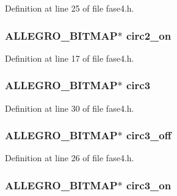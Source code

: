 Definition at line 25 of file fase4.\-h.

\hypertarget{struct_level_quatro_aa582b8f9acdbb85a2d1d54705e26fa15}{
\subsubsection[{circ2\-\_\-on}]{\setlength{\rightskip}{0pt plus 5cm}A\-L\-L\-E\-G\-R\-O\-\_\-\-B\-I\-T\-M\-A\-P$\ast$ circ2\-\_\-on}}\label{struct_level_quatro_aa582b8f9acdbb85a2d1d54705e26fa15}


Definition at line 17 of file fase4.\-h.

\hypertarget{struct_level_quatro_aaa21201ceebf455212233414bd6eedbc}{
\subsubsection[{circ3}]{\setlength{\rightskip}{0pt plus 5cm}A\-L\-L\-E\-G\-R\-O\-\_\-\-B\-I\-T\-M\-A\-P$\ast$ circ3}}\label{struct_level_quatro_aaa21201ceebf455212233414bd6eedbc}


Definition at line 30 of file fase4.\-h.

\hypertarget{struct_level_quatro_a91273d7098df87dd93c9f9a10b62ed08}{
\subsubsection[{circ3\-\_\-off}]{\setlength{\rightskip}{0pt plus 5cm}A\-L\-L\-E\-G\-R\-O\-\_\-\-B\-I\-T\-M\-A\-P$\ast$ circ3\-\_\-off}}\label{struct_level_quatro_a91273d7098df87dd93c9f9a10b62ed08}


Definition at line 26 of file fase4.\-h.

\hypertarget{struct_level_quatro_ad58139cfabe6836662aec8a3293c9208}{
\subsubsection[{circ3\-\_\-on}]{\setlength{\rightskip}{0pt plus 5cm}A\-L\-L\-E\-G\-R\-O\-\_\-\-B\-I\-T\-M\-A\-P$\ast$ circ3\-\_\-on}}\label{struct_level_quatro_ad58139cfabe6836662aec8a3293c9208}


